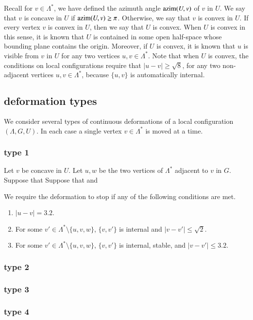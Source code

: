 Recall for $v\in\Lambda^*$, we have defined the azimuth angle
${\operatorname{azim}}(U,v)$ of $v$ in $U$.  We say that $v$ is concave in $U$
if ${\operatorname{azim}}(U,v)\ge\pi$.  Otherwise, we say that $v$ is convex
in $U$.  If every vertex $v$ is convex in $U$, then we say that $U$
is convex.  When $U$ is convex in this sense, it is known that $U$
is contained in some open half-space whose bounding plane
contains the origin.  Moreover,
if $U$ is convex,
it is known that $u$ is visible from $v$ in $U$
for any two vertices $u,v\in\Lambda^*$.  Note that when $U$ is 
convex, the conditions on local configurations require that
$|u-v|\ge\sqrt8$, for any two non-adjacent vertices $u,v\in\Lambda^*$,
because $\{u,v\}$ is automatically internal.

\subsection{deformation types}

We consider several types of continuous 
deformations of a local configuration
$(\Lambda,G,U)$.  In each case a single vertex $v\in\Lambda^*$ is
moved at a time.

\subsubsection{type 1}  
Let $v$ be concave in $U$.  Let $u,w$ be the two vertices of
$\Lambda^*$ adjacent to $v$ in $G$.  Suppose that  
Suppose that 
and 

We require the deformation to stop if any of the following conditions
are met.
\begin{enumerate}
\item $|u-v|=3.2$.  
\item For some $v'\in\Lambda^*\setminus\{u,v,w\}$, 
$\{v,v'\}$ is internal and $|v-v'|\le \sqrt2$.
\item For some $v'\in\Lambda^*\setminus\{u,v,w\}$,
$\{v,v'\}$ is internal, stable, and $|v-v'|\le 3.2$.
\end{enumerate}


\subsubsection{type 2}

\subsubsection{type 3}

\subsubsection{type 4}






